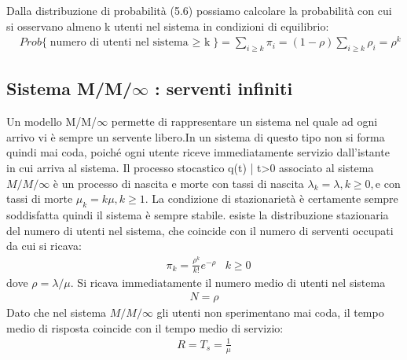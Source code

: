 Dalla distribuzione di probabilità (5.6) possiamo calcolare la probabilità con cui si
osservano almeno k utenti nel sistema in condizioni di equilibrio:
\begin{align}
    & Prob \{ \textrm{numero di utenti nel sistema $\geq$ k}\}= \sum_{i\geq k}^{} \pi_i= (1-\rho) \sum_{i\geq k}^{} \rho_i =\rho^k
\end{align}

\subsection{Sistema M/M/$\infty$ : serventi infiniti}
Un modello M/M/$\infty$ permette di rappresentare un sistema nel quale ad ogni
arrivo vi è sempre un servente libero.In un sistema di questo tipo non si forma quindi
mai coda, poiché ogni utente riceve immediatamente servizio dall’istante in cui arriva
al sistema. Il processo stocastico {q(t) | t>0} associato al sistema $M/M/\infty$ è un processo di
nascita e morte con tassi di nascita $\lambda_k=\lambda, k\geq0, $e con tassi di morte $\mu_k= k \mu, k\geq1$. La condizione di stazionarietà è certamente sempre soddisfatta quindi il
sistema è sempre stabile. esiste la distribuzione stazionaria del numero di utenti nel
sistema, che coincide con il numero di serventi occupati da cui si ricava:
\begin{align}
    & \pi_k = \frac{\rho^k}{k!} e^{-\rho} & k\geq 0
\end{align}
dove $\rho = \lambda/\mu$.
Si ricava immediatamente il numero medio di utenti nel sistema 
\begin{align}
    N = \rho
\end{align}
Dato che nel sistema $M/M/\infty $ gli utenti non sperimentano mai coda, il tempo medio
di risposta coincide con il tempo medio di servizio:
\begin{align}
    R = T_s = \frac{1}{\mu}
\end{align}

